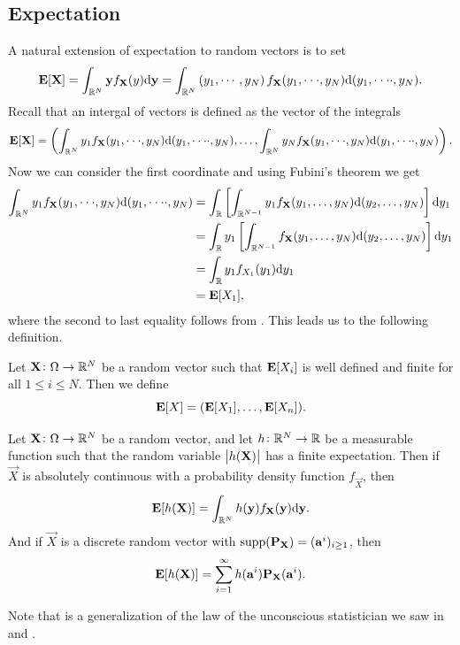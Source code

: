 \documentclass[11pt,a4paper]{article}
\begin{document}
\subsection{Expectation}
\begin{remark}
A natural extension of expectation to random vectors is to set
\[
  \mathbf{E}[\boldsymbol{\mathbf{X}}] =
  \int_{\mathbb{R}^N} \boldsymbol{\mathbf{y}} f_{\boldsymbol{\mathbf{X}}}(y) \mathrm{d} \boldsymbol{\mathbf{y}} =
  \int_{\mathbb{R}^{N}} 
  \left(y_{1},\cdots,y_{N}\right)
  f_{\boldsymbol{\mathbf{X}}} (y_{1},\cdot\cdot\cdot,y_{N})
  \mathrm{d} (y_{1},\cdot\cdot\cdot\cdot,y_{N}).
\]
Recall that an intergal of vectors is defined as the vector of the
integrals
\[
  \mathbf{E}[\boldsymbol{\mathbf{X}}] =
  \left(
  \int_{\mathbb{R}^{N}} 
  y_1 f_{\boldsymbol{\mathbf{X}}} (y_{1},\cdot\cdot\cdot,y_{N})
  \mathrm{d} (y_{1},\cdot\cdot\cdot\cdot,y_{N})
  ,\dots,
  \int_{\mathbb{R}^{N}} 
  y_N f_{\boldsymbol{\mathbf{X}}} (y_{1},\cdot\cdot\cdot,y_{N})
  \mathrm{d} (y_{1},\cdot\cdot\cdot\cdot,y_{N})
  \right).
\]
Now we can consider the first coordinate and using Fubini's theorem we
get
\begin{align*}
  \int_{\mathbb{R}^{N}} 
  y_1 f_{\vec{X}} (y_{1},\cdot\cdot\cdot,y_{N})
  \dif (y_{1},\cdot\cdot\cdot\cdot,y_{N}) &=
  \int_{\mathbb{R}}
  \left[\int_{\mathbb{R}^{N-1}}
  y_{1}f_{\vec{X}}(y_{1},\dots,y_{N}) \dif (y_{2},\dots, y_{N})\right] \dy_{1} \\
  &= \int_{\mathbb{R}} y_1
  \left[\int_{\mathbb{R}^{N-1}}
  f_{\vec{X}}(y_{1},\dots,y_{N}) \dif (y_{2},\dots, y_{N})\right] \dy_{1} \\
  &= \int_{\mathbb{R}} y_1
  f_{X_1}(y_1) \dy_1 \\
  &= \E[X_1],
\end{align*}
where the second to last equality follows from .
This leads us to the following definition.
\end{remark}

\begin{definition}[Expectation]
  Let $\boldsymbol{\mathbf{X}} \colon \Omega \to \mathbb{R}^N$ be a random vector such
  that $\mathbf{E}[X_i]$ is well defined and finite for all $1 \le i \le N$.
  Then we define
  \[
    \mathbf{E}[X] = (\mathbf{E}[X_1],\dots,\mathbf{E}[X_n]).
  \]
\end{definition}

\begin{proposition}
  \label{prop:vector-lotus}
  Let $\boldsymbol{\mathbf{X}} \colon \Omega \to \mathbb{R}^N$ be a random vector, and let
  $h \colon \mathbb{R}^N \to \mathbb{R}$ be a measurable function such that the
  random variable $\left\lvert h(\boldsymbol{\mathbf{X}})\right\rvert$ has a finite expectation.
  Then if $\vec{X}$ is absolutely continuous with a probability density
  function $f_{\vec{X}}$, then
  \[
    \mathbf{E}[h(\boldsymbol{\mathbf{X}})] =
    \int_{\mathbb{R}^N} h(\boldsymbol{\mathbf{y}}) f_{\boldsymbol{\mathbf{X}}}(\boldsymbol{\mathbf{y}}) \mathrm{d}\boldsymbol{\mathbf{y}}.
  \]
  And if $\vec{X}$ is a discrete random vector with
  $\operatorname{supp}(\mathbf{P}_{\boldsymbol{\mathbf{X}}}) = (\boldsymbol{\mathbf{a}}^i)_{i \geq 1}$, then
  \[
    \mathbf{E}[h(\boldsymbol{\mathbf{X}})] =
    \sum_{i=1}^{\infty} h(\boldsymbol{\mathbf{a}}^i) \mathbf{P}_{\boldsymbol{\mathbf{X}}}(\boldsymbol{\mathbf{a}}^i).
  \]
\end{proposition}
\begin{remark}
  Note that  is
  a generalization of the law of the unconscious statistician
  we saw in  and . 
\end{remark}
\end{document}

